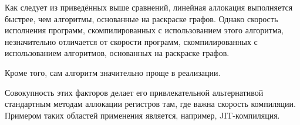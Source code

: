 Как следует из приведённых выше сравнений, линейная аллокация выполняется быстрее, чем алгоритмы,
основанные на раскраске графов.
Однако скорость исполнения программ, скомпилированных с использованием
этого алгоритма, незначительно отличается от скорости программ,
скомпилированных с использованием алгоритмов,
основанных на раскраске графов.

Кроме того, сам алгоритм значительно проще в реализации.

Совокупность этих факторов делает его привлекательной альтернативой стандартным методам аллокации регистров там,
где важна скорость компиляции.
Примером таких областей применения является, например, JIT-компиляция.
